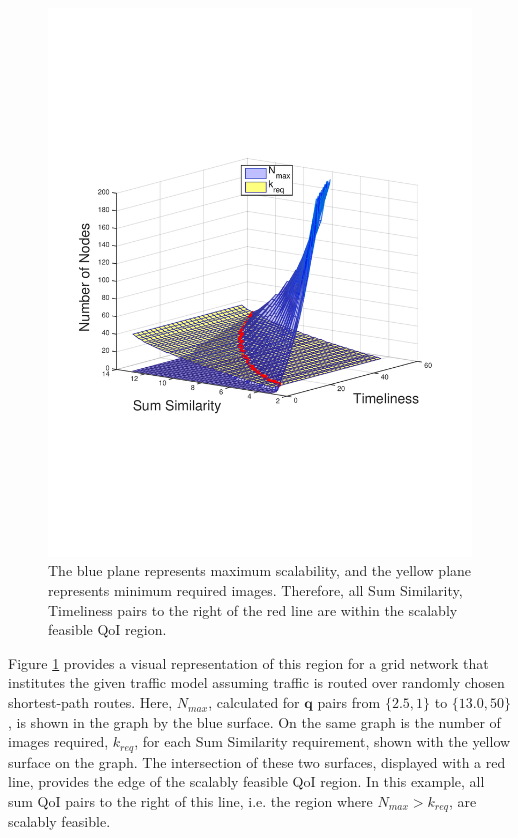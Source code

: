 \vspace{-4mm}
\begin{figure}[ht]
\centering
\includegraphics[scale=0.31, clip=true, trim=10mm 65mm 20mm 77mm]{scal_feas_qoi_region_3d_plot_3.pdf}
\vspace{-5mm}
\caption{The blue plane represents maximum scalability, and the yellow plane represents minimum required images.  Therefore, all {Sum Similarity, Timeliness} pairs to the right of the red line are within the scalably feasible QoI region.}
 \label{fig:scal_feasible_region}
 \vspace{-3mm}
\end{figure}

Figure \ref{fig:scal_feasible_region} provides a visual representation of this region for a grid network that institutes the given traffic model assuming traffic is routed over randomly chosen shortest-path routes.
Here, $N_{max}$, calculated for $\mathbf{q}$ pairs from $\{2.5,1\}$ to $\{13.0, 50\}$, is shown in the graph by the blue surface.  On the same graph is the number of images required, $k_{req}$, for each Sum Similarity requirement, shown with the yellow surface on the graph.  The intersection of these two surfaces, displayed with a red line, provides the edge of the scalably feasible QoI region.  In this example, all sum QoI pairs to the right of this line, i.e. the region where $N_{max} > k_{req}$, are scalably feasible.  

